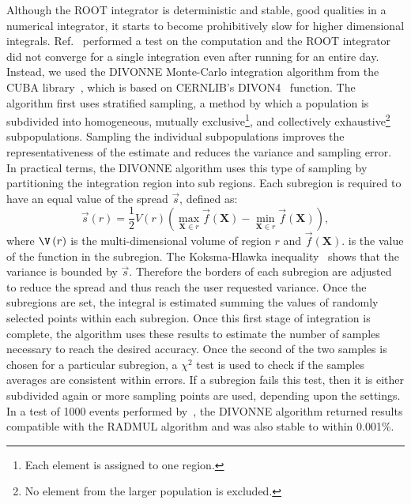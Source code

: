 Although the ROOT integrator is deterministic and stable, good qualities in a numerical integrator, it starts to become prohibitively slow for higher dimensional integrals.
Ref.~\cite{Dong2008} performed a test on the \ttbar computation and the ROOT integrator did not converge for a single integration even after running for an entire day.
Instead, we used the DIVONNE Monte-Carlo integration algorithm from the CUBA library~\cite{Hahn:2004fe}, which is based on CERNLIB’s DIVON4~\cite{Friedman:1981:NPP:355934.355939} function.
The algorithm first uses stratified sampling, a method by which a population is subdivided into homogeneous, mutually exclusive\footnote{Each element is assigned to one region.}, and collectively exhaustive\footnote{No element from the larger population is excluded.} subpopulations.
Sampling the individual subpopulations improves the representativeness of the estimate and reduces the variance and sampling error.
In practical terms, the DIVONNE algorithm uses this type of sampling by partitioning the integration region into sub regions.
Each subregion is required to have an equal value of the spread $\vec{s}$, defined as:
\begin{equation}
   \vec{s}\left(r\right)=\frac{1}{2}V\left(r\right)\left(\max_{\textbf{X}{\in}r}\vec{f}\left(\textbf{X}\right)-\min_{\textbf{X}{\in}r}\vec{f}\left(\textbf{X}\right)\right),
\end{equation}
where $\V\left(r\right)$ is the multi-dimensional volume of region $r$ and $\vec{f}\left(\textbf{X}\right)$. is the value of the function in the subregion.
The Koksma-Hlawka inequality~\cite{Koksma1943,Hlawka1961,Hickernell2004} shows that the variance is bounded by $\vec{s}$.
Therefore the borders of each subregion are adjusted to reduce the spread and thus reach the user requested variance.
Once the subregions are set, the integral is estimated summing the values of randomly selected points within each subregion.
Once this first stage of integration is complete, the algorithm uses these results to estimate the number of samples necessary to reach the desired accuracy.
Once the second of the two samples is chosen for a particular subregion, a $\chi^{2}$ test is used to check if the samples averages are consistent within errors.
If a subregion fails this test, then it is either subdivided again or more sampling points are used, depending upon the settings.
In a test of 1000 events performed by~\cite{Dong2008}, the DIVONNE algorithm returned results compatible with the RADMUL algorithm and was also stable to within 0.001\%.

